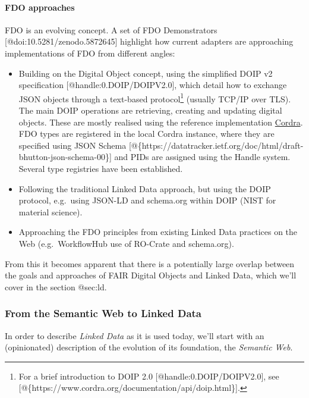 \hypertarget{fdo-approaches}{%
\paragraph{FDO approaches}\label{fdo-approaches}}

FDO is an evolving concept. A set of FDO Demonstrators
{[}@doi:10.5281/zenodo.5872645{]} highlight how current adapters are
approaching implementations of FDO from different angles:

\begin{itemize}
\tightlist
\item
  Building on the Digital Object concept, using the simplified DOIP v2
  specification {[}@handle:0.DOIP/DOIPV2.0{]}, which detail how to
  exchange JSON objects through a text-based protocol\footnote{For a
    brief introduction to DOIP 2.0 {[}@handle:0.DOIP/DOIPV2.0{]}, see
    {[}@\{https://www.cordra.org/documentation/api/doip.html\}{]}.}
  (usually TCP/IP over TLS). The main DOIP operations are retrieving,
  creating and updating digital objects. These are mostly realised using
  the reference implementation \href{https://cordra.org/}{Cordra}. FDO
  types are registered in the local Cordra instance, where they are
  specified using JSON Schema
  {[}@\{https://datatracker.ietf.org/doc/html/draft-bhutton-json-schema-00\}{]}
  and PIDs are assigned using the Handle system. Several type registries
  have been established.
\item
  Following the traditional Linked Data approach, but using the DOIP
  protocol, e.g.~using JSON-LD and schema.org within DOIP (NIST for
  material science).
\item
  Approaching the FDO principles from existing Linked Data practices on
  the Web (e.g.~WorkflowHub use of RO-Crate and schema.org).
\end{itemize}

From this it becomes apparent that there is a potentially large overlap
between the goals and approaches of FAIR Digital Objects and Linked
Data, which we'll cover in the section @sec:ld.

\hypertarget{sec:ld}{%
\subsubsection{From the Semantic Web to Linked Data}\label{sec:ld}}

In order to describe \emph{Linked Data} as it is used today, we'll start
with an (opinionated) description of the evolution of its foundation,
the \emph{Semantic Web}.

